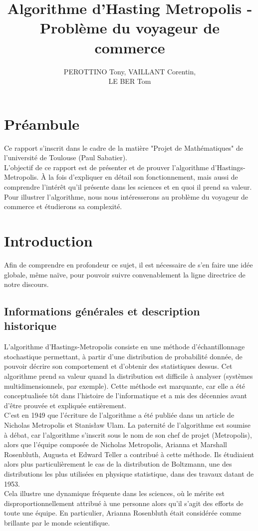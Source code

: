\documentclass{article}
\title{Algorithme d'Hasting Metropolis - Problème du voyageur de commerce}
\author{PEROTTINO Tony, VAILLANT Corentin, \\ LE BER Tom}
\begin{document}
\maketitle

\newpage
\tableofcontents
\newpage

\section*{Préambule}

Ce rapport s'inscrit dans le cadre de la matière "Projet de Mathématiques" de l'université de Toulouse (Paul Sabatier). \\
L'objectif de ce rapport est de présenter et de prouver l'algorithme d'Hastings-Metropolis. À la fois d'expliquer en détail son fonctionnement, mais aussi de comprendre l'intérêt qu'il présente dans les sciences et en quoi il prend sa valeur. \\
Pour illustrer l'algorithme, nous nous intéresserons au problème du voyageur de commerce et étudierons sa complexité.


\section{Introduction}

Afin de comprendre en profondeur ce sujet, il est nécessaire de s'en faire une idée globale, même naïve, pour pouvoir suivre convenablement la ligne directrice de notre discours.

\subsection{Informations générales et description historique}

L'algorithme d'Hastings-Metropolis consiste en une méthode d'échantillonnage stochastique permettant, à partir d'une distribution de probabilité donnée, de pouvoir décrire son comportement et d'obtenir des statistiques dessus. Cet algorithme prend sa valeur quand la distribution est difficile à analyser (systèmes multidimensionnels, par exemple). Cette méthode est marquante, car elle a été conceptualisée tôt dans l'histoire de l'informatique et a mis des décennies avant d'être prouvée et expliquée entièrement. \\
C'est en 1949 que l'écriture de l'algorithme a été publiée dans un article de Nicholas Metropolis et Stanisław Ulam. La paternité de l'algorithme est soumise à débat, car l'algorithme s'inscrit sous le nom de son chef de projet (Metropolis), alors que l'équipe composée de Nicholas Metropolis, Arianna et Marshall Rosenbluth, Augusta et Edward Teller a contribué à cette méthode. Ils étudiaient alors plus particulièrement le cas de la distribution de Boltzmann, une des distributions les plus utilisées en physique statistique, dans des travaux datant de 1953. \\
Cela illustre une dynamique fréquente dans les sciences, où le mérite est disproportionnellement attribué à une personne alors qu'il s'agit des efforts de toute une équipe. En particulier, Arianna Rosenbluth était considérée comme brillante par le monde scientifique. \\
\end{document}
